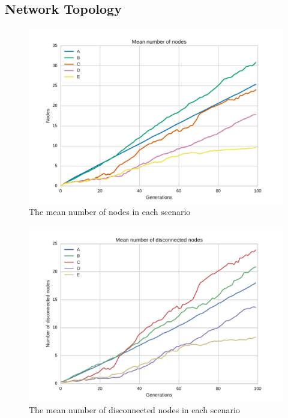 \subsection{Network Topology}
\begin{figure}
\centering
\includegraphics[width=\columnwidth]{fig/sizes}
\caption{The mean number of nodes in each scenario}
\label{fig:sizes}
\end{figure}

\begin{figure}
\centering
\includegraphics[width=\columnwidth]{fig/vestigial_nodes}
\caption{The mean number of disconnected nodes in each scenario}
\label{fig:vestigial_nodes}
\end{figure}


